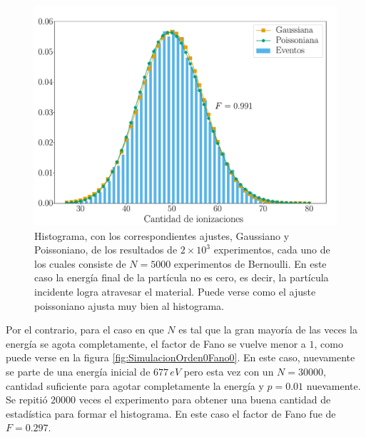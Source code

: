 \begin{figure}%
    \centering
    \includegraphics[scale=0.35]{Figs/Orden0_fano1.pdf}
    \caption{\footnotesize{Histograma, con los correspondientes ajustes, Gaussiano y Poissoniano, de los resultados de $2\times 10^3$ experimentos, cada uno de los cuales consiste de $N = 5000$ experimentos de Bernoulli. En este caso la energía final de la partícula no es cero, es decir, la partícula incidente logra atravesar el material. Puede verse como el ajuste poissoniano ajusta muy bien al histograma.}}
    \label{fig:SimulacionOrden0Fano1}
\end{figure}
\indent Por el contrario, para el caso en que $N$ es tal que la gran mayoría de las veces la energía se agota completamente, el factor de Fano se vuelve menor a $1$, como puede verse en la figura \ref{fig:SimulacionOrden0Fano0}. En este caso, nuevamente se parte de una energía inicial de $677\,\si{eV}$ pero esta vez con un $N = 30000$, cantidad suficiente para agotar completamente la energía y $p=0.01$ nuevamente. Se repitió $20000$ veces el experimento para obtener una buena cantidad de estadística para formar el histograma. En este caso el factor de Fano fue de $F = 0.297$.\\
